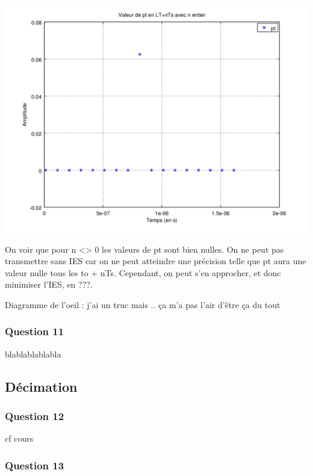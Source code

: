 \documentclass{acm_proc_article-sp}
\begin{document}
\begin{center}
\includegraphics[scale=0.45]{pt_nyquist_10.png}
\end{center}

On voir que pour n <> 0 les valeurs de pt sont bien nulles. On ne peut pas transmettre sans IES car on ne peut atteindre une précision telle que pt aura une valeur nulle tous les to + nTs. Cependant, on peut s'en approcher, et donc minimiser l'IES, en ???.

Diagramme de l'oeil : j'ai un truc mais .. ça m'a pas l'air d'être ça du tout

\subsubsection{Question 11}

blablablablabla

\subsection{Décimation}

\subsubsection{Question 12}

cf cours

\subsubsection{Question 13}
\end{document}
